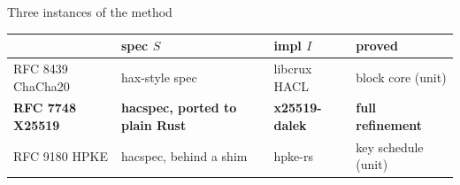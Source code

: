 \documentclass[aspectratio=169,11pt]{beamer}
\newcommand{\code}[1]{\texttt{#1}}
\newcommand{\specside}[1]{\textcolor{refc}{#1}}
\newcommand{\implside}[1]{\textcolor{realc}{#1}}
\begin{document}
\begin{frame}{Three instances of the method}
  \centering
  \scriptsize
  \renewcommand{\arraystretch}{1.35}
  \begin{tabular}{l l l l}
    & \specside{\textbf{spec $S$}} & \implside{\textbf{impl $I$}} & \textcolor{proofc}{\textbf{proved}} \\
    \hline
    RFC 8439 ChaCha20 & hax-style spec & libcrux HACL & block core (unit) \\
    \textbf{RFC 7748 X25519} & \textbf{hacspec, ported to plain Rust} & \textbf{x25519-dalek} & \textbf{full refinement} \\
    RFC 9180 HPKE & hacspec, behind a shim & hpke-rs & key schedule (unit) \\
  \end{tabular}
  \vspace{1.5em}

  \normalsize
\end{frame}
\end{document}
